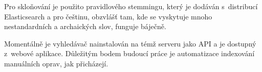 Pro skloňování je použito pravidlového stemmingu, který je dodáván s~distribucí
Elasticsearch a pro češtinu, obzvlášť tam, kde se vyskytuje mnoho
nestandardních a archaických slov, funguje báječně.

Momentálně je vyhledávač nainstalován na témž serveru jako API a je dostupný
z~webové aplikace. Důležitým bodem budoucí práce je automatizace indexování
manuálních oprav, jak přicházejí.
